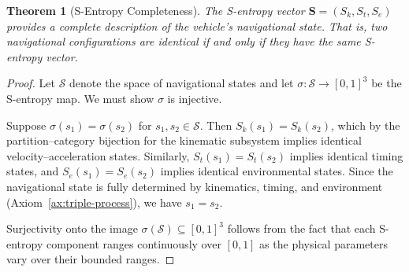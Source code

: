 \documentclass[twocolumn,10pt]{article}
\newtheorem{theorem}{Theorem}[section]
\theoremstyle{definition}
\theoremstyle{remark}
\newcommand{\Sent}{\mathbf{S}}
\begin{document}
\begin{theorem}[S-Entropy Completeness]\label{thm:s-completeness}
The S-entropy vector $\Sent = (S_k, S_t, S_e)$ provides a complete
description of the vehicle's navigational state. That is, two
navigational configurations are identical if and only if they have the same
S-entropy vector.
\end{theorem}

\begin{proof}
Let $\mathcal{S}$ denote the space of navigational states and let
$\sigma: \mathcal{S} \to [0,1]^3$ be the S-entropy map. We must show
$\sigma$ is injective.

Suppose $\sigma(s_1) = \sigma(s_2)$ for $s_1, s_2 \in \mathcal{S}$.
Then $S_k(s_1) = S_k(s_2)$, which by the partition--category bijection
for the kinematic subsystem implies identical velocity--acceleration states.
Similarly, $S_t(s_1) = S_t(s_2)$ implies identical timing states, and
$S_e(s_1) = S_e(s_2)$ implies identical environmental states. Since the
navigational state is fully determined by kinematics, timing, and
environment (Axiom~\ref{ax:triple-process}), we have $s_1 = s_2$.

Surjectivity onto the image $\sigma(\mathcal{S}) \subseteq [0,1]^3$
follows from the fact that each S-entropy component ranges continuously
over $[0,1]$ as the physical parameters vary over their bounded ranges.
\end{proof}
\end{document}
